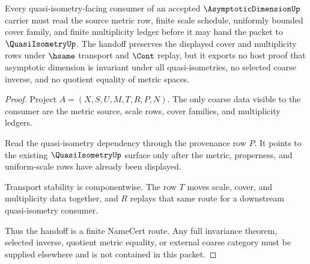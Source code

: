 \begin{theorem}
\label{thm:asymptotic-dimension-quasi-isometry-handoff}
Every quasi-isometry-facing consumer of an accepted $\AsymptoticDimensionUp$ carrier must read the source metric row, finite scale schedule, uniformly bounded cover family, and finite multiplicity ledger before it may hand the packet to $\QuasiIsometryUp$. The handoff preserves the displayed cover and multiplicity rows under $\hsame$ transport and $\Cont$ replay, but it exports no host proof that asymptotic dimension is invariant under all quasi-isometries, no selected coarse inverse, and no quotient equality of metric spaces.
\end{theorem}
\begin{proof}
Project $A=(X,S,U,M,T,R,P,N)$. The only coarse data visible to the consumer are the metric source, scale rows, cover families, and multiplicity ledgers.

Read the quasi-isometry dependency through the provenance row $P$. It points to the existing $\QuasiIsometryUp$ surface only after the metric, properness, and uniform-scale rows have already been displayed.

Transport stability is componentwise. The row $T$ moves scale, cover, and multiplicity data together, and $R$ replays that same route for a downstream quasi-isometry consumer.

Thus the handoff is a finite NameCert route. Any full invariance theorem, selected inverse, quotient metric equality, or external coarse category must be supplied elsewhere and is not contained in this packet.
\end{proof}




